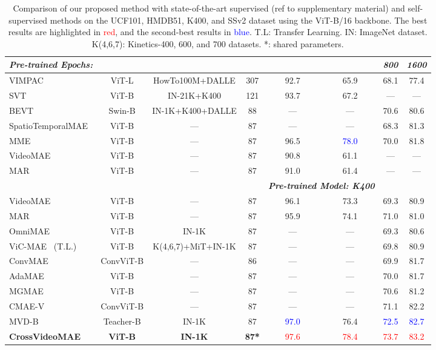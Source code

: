 \begin{table*}[t!]
\begin{tabular}[t]{lccccccc}
\midrule

\multicolumn{6}{l}{\textbf{\textit{Pre-trained Epochs:}}} & \textbf{\textit{800}} & \textbf{\textit{1600}} \\
\midrule\midrule
VIMPAC~\cite{tan2021vimpac} & ViT-L & HowTo100M+DALLE & 307 & 92.7 & 65.9 & 68.1 & 77.4 \\
SVT~\cite{ranasinghe2022self} & ViT-B &IN-21K+K400 & 121 & 93.7 & 67.2 & — & — \\
BEVT~\cite{wang2022bevt} & Swin-B & IN-1K+K400+DALLE & 88 & — & — & 70.6 & 80.6 \\
SpatioTemporalMAE~\cite{feichtenhofer2022masked} & ViT-B & — & 87 & — & — & 68.3 & 81.3 \\
MME~\cite{sun2023masked} & ViT-B & — & 87 & 96.5 & \textcolor{blue}{78.0} & 70.0 & 81.8 \\
VideoMAE~\cite{tong2022videomae} & ViT-B & — & 87 & 90.8 & 61.1 & — & — \\
MAR~\cite{qing2023mar} & ViT-B & — & 87 & 91.0 & 61.4 & — & — \\
\midrule
& & & & \multicolumn{2}{c}{\textbf{\textit{Pre-trained Model: K400}}} & & \\
\midrule
VideoMAE~\cite{tong2022videomae} & ViT-B & — & 87 & 96.1 & 73.3 & 69.3 & 80.9 \\
MAR~\cite{qing2023mar} & ViT-B & — & 87 & 95.9 & 74.1 & 71.0 & 81.0 \\
\midrule
OmniMAE~\cite{girdhar2023omnimae} & ViT-B & IN-1K & 87 & — & — & 69.3 & 80.6 \\
ViC-MAE~\cite{hernandez2023visual} (T.L.) & ViT-B & K(4,6,7)+MiT+IN-1K & 87 & — & — & 69.8 & 80.9 \\
ConvMAE~\cite{gao2022mcmae} & ConvViT-B & — & 86 & — & — & 69.9 & 81.7 \\
AdaMAE~\cite{bandara2023adamae} & ViT-B & — & 87 & — & — & 70.0 & 81.7 \\
MGMAE~\cite{huang2023mgmae} & ViT-B & — & 87 & — & — & 70.6 & 81.2 \\
CMAE-V~\cite{lu2023cmae} & ConvViT-B & — & 87 & — & — & 71.1 & 82.2 \\
MVD-B~\cite{wang2023masked} & Teacher-B & IN-1K & 87 & \textcolor{blue}{97.0} & 76.4 & \textcolor{blue}{72.5} & \textcolor{blue}{82.7} \\
\rowcolor[gray]{0.9}
\textbf{CrossVideoMAE} & \textbf{ViT-B} & \textbf{IN-1K} & \textbf{87*} & \textcolor{red}{97.6} & \textcolor{red}{78.4} & \textcolor{red}{73.7} & \textcolor{red}{83.2} \\
\bottomrule
\end{tabular}
\vspace{-5pt}
\captionsetup{font=footnotesize}
\caption{Comparison of our proposed method with state-of-the-art supervised (ref to supplementary material) and self-supervised methods on the UCF101, HMDB51, K400, and SSv2 dataset using the ViT-B/16 backbone. The best results are highlighted in \textcolor{red}{red}, and the second-best results in \textcolor{blue}{blue}. T.L: Transfer Learning. IN: ImageNet dataset. K(4,6,7): Kinetics-400, 600, and 700 datasets. *: shared parameters.}
\label{tab:results}
\vspace{-15pt}
\end{table*}

